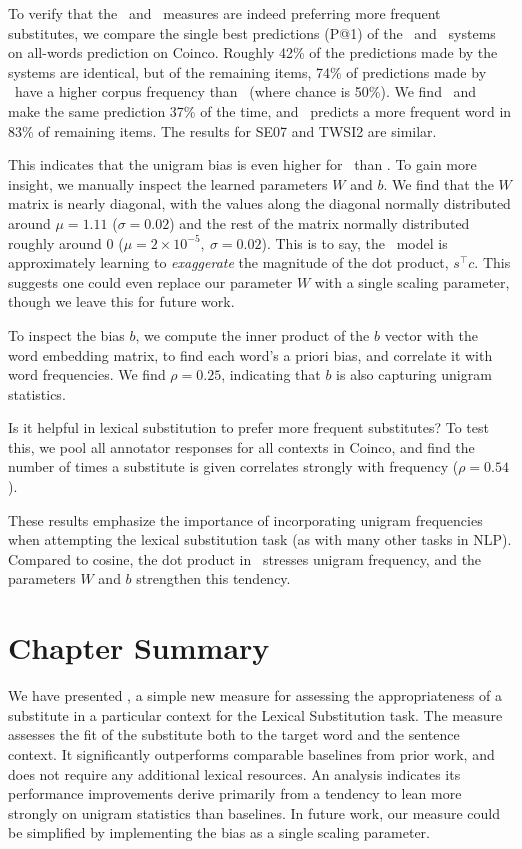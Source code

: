 To verify that the \ourmeas~and \ourmeasparam~measures are indeed preferring more frequent
substitutes, we compare the single best predictions (P@1) of the \balAddCos~and
\ourmeas~systems on all-words prediction on Coinco. Roughly 42\% of the predictions made
by the systems are identical, but of the remaining items, 74\% of
predictions made by \ourmeas~have a higher corpus frequency than \balAddCos~(where
chance is 50\%). We find \balAddCos~and \ourmeasparam~
make the same prediction 37\% of the time, and \ourmeasparam~predicts a
more frequent word in 83\% of remaining items. The results for SE07 and
TWSI2 are similar.

This indicates that the unigram bias is even higher for \ourmeasparam~than
\ourmeas. To gain more insight, we manually inspect the learned parameters $W$
and $b$. We find that the $W$ matrix is nearly diagonal, with the values along
the diagonal normally distributed around $\mu=1.11$ ($\sigma=0.02$) and the rest
of the matrix normally distributed roughly around 0 ($\mu=2\times10^{-5},~\sigma=0.02$). This
is to say, the \ourmeasparam~model is approximately learning to {\em exaggerate} the
magnitude of the dot product, $s^\top c$. This suggests one could even replace our
parameter $W$ with a single scaling parameter, though we leave this
for future work.

To inspect the bias $b$, we compute the inner product of the $b$ vector with
the word embedding matrix, to find each word's a priori bias, and correlate it with word frequencies. We find
$\rho=0.25$, indicating that $b$ is also capturing unigram
statistics.

Is it helpful in lexical substitution to prefer more frequent substitutes? To
test this, we pool all annotator responses for all contexts in Coinco, and find
the number of times a substitute is given correlates strongly with frequency
($\rho=0.54$).

These results emphasize the importance of incorporating unigram
frequencies when attempting the lexical substitution task (as with
many other tasks in NLP). Compared to
cosine, the dot product in \ourmeas~stresses unigram frequency, and
the parameters $W$ and $b$ strengthen this tendency.


\section{Chapter Summary}

We have presented \ourmeasparam, a simple new measure for assessing the
appropriateness of a substitute in a particular context for the Lexical
Substitution task. The measure assesses the fit of the substitute both to the
target word and the sentence context. It significantly outperforms comparable
baselines from prior work, and does not require any additional lexical
resources. An analysis indicates its performance improvements derive primarily
from a tendency to lean more strongly on unigram statistics than baselines. In
future work, our measure could be simplified by implementing the bias as a
single scaling parameter.

